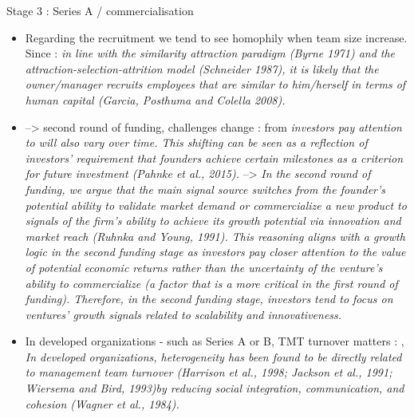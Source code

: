 \begin{itemize}
\begin{itemize}
Stage 3 : Series A / commercialisation\\
\begin{itemize}
  \item Regarding the recruitment we tend to see homophily when team size increase. Since \citep{de2010interrelationships} : \textit{in line with the similarity attraction paradigm (Byrne 1971) and the attraction-selection-attrition model (Schneider 1987), it is likely that the owner/manager recruits employees that are similar to him/herself in terms of human capital (Garcia, Posthuma and Colella 2008).}
  \item --> second round of funding, challenges change : from \citep{ko2018signaling} \textit{investors pay attention to will also vary over time. This shifting can be seen as a reflection of investors' requirement that founders achieve certain milestones as a criterion for future investment (Pahnke et al., 2015).} -->  \textit{In the second round of funding, we argue that the main signal source switches from the founder's potential ability to validate market demand or commercialize a new product to signals of the firm's ability to achieve its growth potential via innovation and market reach (Ruhnka and Young, 1991). This reasoning aligns with a growth logic in the second funding stage as investors pay closer attention to the value of potential economic returns rather than the uncertainty of the venture's ability to commercialize (a factor that is a more critical in the first round of funding). Therefore, in the second funding stage, investors tend to focus on ventures' growth signals related to scalability and innovativeness.}
  \item In developed organizations - such as Series A or B, TMT turnover matters : \citet{chandler2005antecedents}, \textit{In developed organizations, heterogeneity has been found to be directly related to management team turnover (Harrison et al., 1998; Jackson et al., 1991; Wiersema and Bird, 1993)by reducing social integration, communication, and cohesion (Wagner et al., 1984).}
\end{itemize}


\end{itemize}
\end{itemize}
